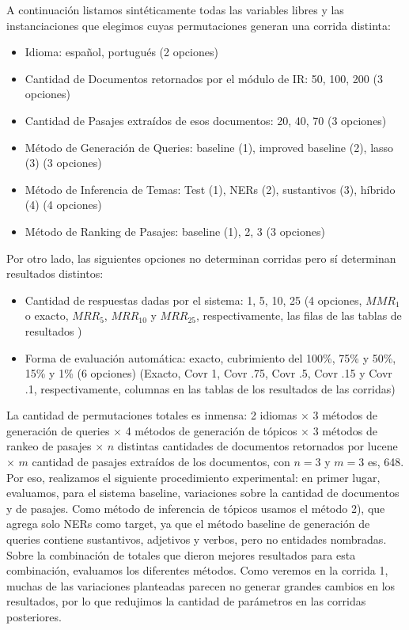 A continuación listamos sintéticamente todas las variables libres y las instanciaciones que elegimos cuyas permutaciones generan una corrida distinta:

\begin{itemize}
  \item Idioma: español, portugués (2 opciones)
  \item Cantidad de Documentos retornados por el módulo de IR: 50, 100, 200 (3 opciones)
  \item Cantidad de Pasajes extraídos de esos documentos: 20, 40, 70 (3 opciones)
  \item Método de Generación de Queries: baseline (1), improved baseline (2), lasso (3) (3 opciones)
  \item Método de Inferencia de Temas: Test (1), NERs (2), sustantivos (3), híbrido (4) (4 opciones)
  \item Método de Ranking de Pasajes: baseline (1), 2, 3 (3 opciones)
\end{itemize}

Por otro lado, las siguientes opciones no determinan corridas pero sí determinan resultados distintos:

\begin{itemize}
  \item Cantidad de respuestas dadas por el sistema: 1, 5, 10, 25 (4 opciones, $MMR_1$ o exacto, $MRR_5$, $MRR_10$ y $MRR_25$, respectivamente, las filas de las tablas de resultados )
  \item Forma de evaluación automática: exacto, cubrimiento del 100\%, 75\% y 50\%, 15\%  y 1\% (6 opciones) (Exacto, Covr 1, Covr .75, Covr .5, Covr .15 y Covr .1, respectivamente, columnas en las tablas de los resultados de las corridas)
\end{itemize}

La cantidad de permutaciones totales es inmensa: 2 idiomas $\times$ 3 métodos de generación de queries $\times$ 4 métodos de generación de tópicos $\times$ 3 métodos de rankeo de pasajes $\times$ $n$ distintas cantidades de documentos retornados por lucene $\times$ $m$ cantidad de pasajes extraídos de los documentos, con $n=3$ y $m=3$ es, 648. Por eso, realizamos el siguiente procedimiento experimental: en primer lugar, evaluamos, para el sistema baseline, variaciones sobre la cantidad de documentos y de pasajes. Como método  de inferencia de tópicos usamos el método 2), que agrega solo NERs como target, ya que el método baseline de generación de queries contiene sustantivos, adjetivos y verbos, pero no entidades nombradas. Sobre la combinación de totales que dieron mejores resultados para esta combinación, evaluamos los diferentes métodos. Como veremos en la corrida 1, muchas de las variaciones planteadas parecen no generar grandes cambios en los resultados, por lo que redujimos la cantidad de parámetros en las corridas posteriores. \newline

